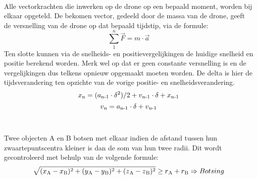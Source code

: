 \\
Alle vectorkrachten die inwerken op de drone op een bepaald moment, worden bij elkaar opgeteld. De bekomen vector, gedeeld door de massa van de drone, geeft de versnelling van de drone op dat bepaald tijdstip, via de formule:
\\
\begin{equation*}
\sum_{1}^{n} \vec{F} = m \cdot \vec{a} \label{krachtenevenwicht}
\end{equation*}
Ten slotte kunnen via de snelheids- en positievergelijkingen de huidige snelheid en positie berekend worden. Merk wel op dat er geen constante versnelling is en de vergelijkingen dus telkens opnieuw opgemaakt moeten worden. De delta is hier de tijdsverandering ten opzichte van de vorige positie- en snelheidsverandering.
\\
\begin{equation*}
x\textsubscript{n} = (a\textsubscript{n-1} \cdot \delta\textsuperscript{2})/2 + v\textsubscript{n-1} \cdot \delta + x\textsubscript{n-1} \label{positie}
\end{equation*}
\begin{equation*}
v\textsubscript{n} = a\textsubscript{n-1} \cdot \delta + v\textsubscript{n-1} \label{snelheid}
\end{equation*}
\\
\\
Twee objecten A en B botsen met elkaar indien de afstand tussen hun zwaartepuntscentra kleiner is dan de som van hun twee radii. Dit wordt gecontroleerd met behulp van de volgende formule:
\begin{equation*}
\sqrt{(x\textsubscript{A}-x\textsubscript{B})\textsuperscript{2} + (y\textsubscript{A} - y\textsubscript{B})\textsuperscript{2} + (z\textsubscript{A} - z\textsubscript{B})\textsuperscript{2}}  \ge r\textsubscript{A} + r\textsubscript{B} \Rightarrow Botsing
\end{equation*}
\\
\\
